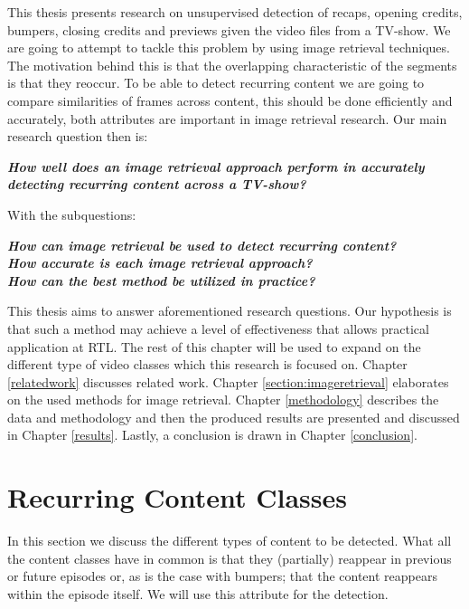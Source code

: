 \documentclass{report}
\begin{document}
This thesis presents research on unsupervised detection of recaps, opening credits, bumpers, closing credits and previews given the video files from a TV-show. We are going to attempt to tackle this problem by using image retrieval techniques. The motivation behind this is that the overlapping characteristic of the segments is that they reoccur. To be able to detect recurring content we are going to compare similarities of frames across content, this should be done efficiently and accurately, both attributes are important in image retrieval research. Our main research question then is:
\newline
\begin{adjustwidth}{0.3in}{0.3in}
\textit{\textbf{How well does an image retrieval approach perform in accurately detecting recurring content across a TV-show?\newline}}
\end{adjustwidth}
With the subquestions: \\
\begin{adjustwidth}{0.3in}{0.3in}
	\textit{\textbf{How can image retrieval be used to detect recurring content?\newline}}\\
	\textit{\textbf{How accurate is each image retrieval approach?\newline}}\\
	\textit{\textbf{How can the best method be utilized in practice?\newline}}
\end{adjustwidth}
This thesis aims to answer aforementioned research questions. Our hypothesis is that such a method may achieve a level of effectiveness that allows practical application at RTL. The rest of this chapter will be used to expand on the different type of video classes which this research is focused on. Chapter \ref{relatedwork} discusses related work. Chapter \ref{section:imageretrieval} elaborates on the used methods for image retrieval. Chapter \ref{methodology} describes the data and methodology and then the produced results are presented and discussed in Chapter \ref{results}. Lastly, a conclusion is drawn in Chapter \ref{conclusion}.

\section{Recurring Content Classes} \label{section:segmentclasses}
In this section we discuss the different types of content to be detected. What all the content classes have in common is that they (partially) reappear in previous or future episodes or, as is the case with bumpers; that the content reappears within the episode itself. We will use this attribute for the detection.
\end{document}
